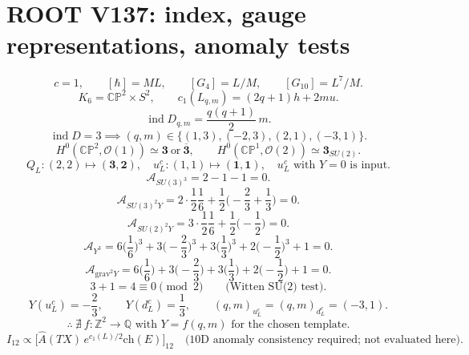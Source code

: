 \documentclass[11pt]{article}
\begin{document}
\section*{ROOT V137: index, gauge representations, anomaly tests}
\[c=1,\qquad [\hbar]=ML,\qquad [G_4]=L/M,\qquad [G_{10}]=L^7/M.\]
\[K_6=\mathbb{CP}^{2}\times S^2,\qquad
c_1(L_{q,m})=(2q+1)h+2mu.\]
\[\operatorname{ind}D_{q,m}=\frac{q(q+1)}{2}\,m.\]
\[\operatorname{ind}D=3\implies (q,m)\in\{(1,3),(-2,3),(2,1),(-3,1)\}.\]
\[H^0(\mathbb{CP}^2,\mathcal O(1))\simeq\mathbf{3}\ \text{or}\ \overline{\mathbf 3},\qquad
H^0(\mathbb{CP}^1,\mathcal O(2))\simeq\mathbf{3}_{SU(2)}.\]
\[Q_L:(2,2)\mapsto(\mathbf3,\mathbf2),\quad
u^c_L:(1,1)\mapsto(\mathbf1,\mathbf1),\quad
u^c_L\text{ with }Y=0\text{ is input}.\]
\[\mathcal A_{SU(3)^3}=2-1-1=0.\]
\[\mathcal A_{SU(3)^2Y}=2\cdot\frac12\frac16+\frac12\Big(-\frac23+\frac13\Big)=0.\]
\[\mathcal A_{SU(2)^2Y}=3\cdot\frac12\frac16+\frac12\Big(-\frac12\Big)=0.\]
\[\mathcal A_{Y^3}=6\Big(\frac16\Big)^3+3\Big(-\frac23\Big)^3+3\Big(\frac13\Big)^3
+2\Big(-\frac12\Big)^3+1=0.\]
\[\mathcal A_{\mathrm{grav}^2Y}=6\Big(\frac16\Big)+3\Big(-\frac23\Big)+3\Big(\frac13\Big)+2\Big(-\frac12\Big)+1=0.\]
\[3+1=4\equiv0\pmod{2}\qquad\text{(Witten SU(2) test).}\]
\[Y(u^c_L)=-\frac23,\qquad Y(d^c_L)=\frac13,
\qquad(q,m)_{u^c_L}=(q,m)_{d^c_L}=(-3,1).\]
\[\therefore\ \nexists\ f:\mathbb Z^2\longrightarrow\mathbb Q\text{ with }Y=f(q,m)\text{ for the chosen template}.\]
\[I_{12}\propto\big[\widehat A(TX)\,e^{c_1(L)/2}\mathrm{ch}(E)\big]_{12}
\quad\text{(10D anomaly consistency required; not evaluated here).}\]
\end{document}
